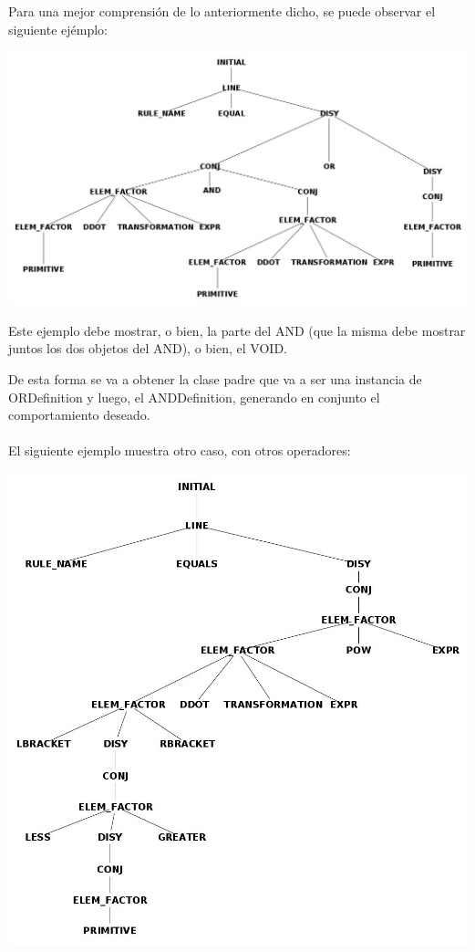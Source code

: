 Para una mejor comprensi\'on de lo anteriormente dicho, se puede observar el siguiente ej\'emplo:



\centerline{\includegraphics[scale=0.40]{arboles_derivacion/Ejemplo_and_or1.jpg}}

Este ejemplo debe mostrar, o bien, la parte del AND  (que la misma debe mostrar juntos los dos objetos del AND), o bien, el VOID.

De esta forma se va a obtener la clase padre que va a ser una instancia de ORDefinition y luego, el ANDDefinition, generando en conjunto el comportamiento deseado.
\\
\\
El siguiente ejemplo muestra otro caso, con otros operadores:



\centerline{\includegraphics[scale=0.40]{arboles_derivacion/brackets_less_greater1.jpg}}

